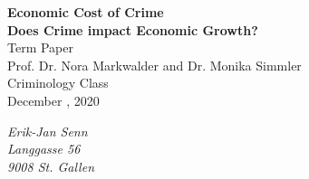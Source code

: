 \documentclass[a4paper,12pt]{article}
\begin{document}



\begin{titlepage}       %

\thispagestyle{empty}   %


\begin{center}
\vspace*{2.5cm}
{\bf  \Large   Economic Cost of Crime }\\
\vspace*{1cm} 
{\bf  \Large   Does Crime impact Economic Growth?}\\
\vspace*{3cm} 
Term Paper\\
Prof. Dr. Nora Markwalder and Dr. Monika Simmler
\\ Criminology Class\\

\vspace*{0.5cm} 
December , 2020\\
\end{center}

\vfill
\begin{flushright}
   \emph{Erik-Jan Senn} \\
    \emph{Langgasse 56}\\
    \emph{9008 St. Gallen}\\

\end{flushright}



% 
% 
% 

\end{titlepage}

\newpage                %





% 
\end{document}
